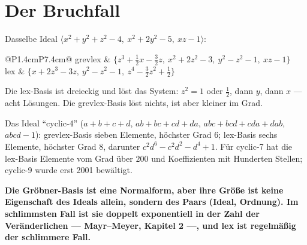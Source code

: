 \section{Der Bruchfall}

\begin{warnung}
Dasselbe Ideal $\langle x^{2} + y^{2} + z^{2} - 4,\ x^{2} + 2y^{2} - 5,\ xz - 1\rangle$:
\begin{center}
{\small
\renewcommand{\arraystretch}{1.5}
\begin{tabular}{@{}P{1.4cm}P{7.4cm}@{}}
\toprule
grevlex & $\{z^{3} + \tfrac12x - \tfrac32z,\ x^{2} + 2z^{2} - 3,\ y^{2} - z^{2} - 1,\ xz - 1\}$\\
lex & $\{x + 2z^{3} - 3z,\ y^{2} - z^{2} - 1,\ z^{4} - \tfrac32z^{2} + \tfrac12\}$\\
\bottomrule
\end{tabular}}
\end{center}
Die lex-Basis ist dreieckig und löst das System: $z^{2} = 1$ oder $\tfrac12$, dann $y$, dann $x$ --- acht Lösungen. Die grevlex-Basis löst nichts, ist aber kleiner im Grad.

Das Ideal \enquote{cyclic-4} ($a + b + c + d$, $ab + bc + cd + da$, $abc + bcd + cda + dab$, $abcd - 1$): grevlex-Basis sieben Elemente, höchster Grad $6$; lex-Basis sechs Elemente, höchster Grad $8$, darunter $c^{2}d^{6} - c^{2}d^{2} - d^{4} + 1$. Für cyclic-7 hat die lex-Basis Elemente vom Grad über $200$ und Koeffizienten mit Hunderten Stellen; cyclic-9 wurde erst 2001 bewältigt.

\begin{center}
\begin{minipage}{0.9\textwidth}
\textbf{Die Gröbner-Basis ist eine Normalform, aber ihre Größe ist keine Eigenschaft des Ideals allein, sondern des Paars (Ideal, Ordnung). Im schlimmsten Fall ist sie doppelt exponentiell in der Zahl der Veränderlichen --- Mayr--Meyer, Kapitel 2 ---, und lex ist regelmäßig der schlimmere Fall.}
\end{minipage}
\end{center}

\begin{center}
\begin{minipage}{0.88\textwidth}
\end{minipage}
\end{center}
\end{warnung}

